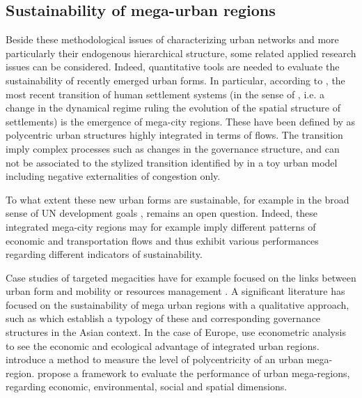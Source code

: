 \documentclass{jimis-en}
\begin{document}
\subsection{Sustainability of mega-urban regions}


Beside these methodological issues of characterizing urban networks and more particularly their endogenous hierarchical structure, some related applied research issues can be considered. Indeed, quantitative tools are needed to evaluate the sustainability of recently emerged urban forms. In particular, according to \cite{lenechet2017peupler}, the most recent transition of human settlement systems (in the sense of \cite{sanders2017peupler}, i.e. a change in the dynamical regime ruling the evolution of the spatial structure of settlements) is the emergence of mega-city regions. These have been defined by \cite{hall2006polycentric} as polycentric urban structures highly integrated in terms of flows. The transition imply complex processes such as changes in the governance structure, and can not be associated to the stylized transition identified by \cite{louf2013modeling} in a toy urban model including negative externalities of congestion only.

To what extent these new urban forms are sustainable, for example in the broad sense of UN development goals \citep{komiyama2006sustainability}, remains an open question. Indeed, these integrated mega-city regions may for example imply different patterns of economic and transportation flows and thus exhibit various performances regarding different indicators of sustainability.

Case studies of targeted megacities have for example focused on the links between urban form and mobility or resources management \citep{sorensen2010megacities}. A significant literature has focused on the sustainability of mega urban regions with a qualitative approach, such as \cite{laquian2011planning} which establish a typology of these and corresponding governance structures in the Asian context. In the case of Europe, \cite{marull2013emerging} use econometric analysis to see the economic and ecological advantage of integrated urban regions. \cite{feng2018spatiotemporal} introduce a method to measure the level of polycentricity of an urban mega-region. \cite{su2017china} propose a framework to evaluate the performance of urban mega-regions, regarding economic, environmental, social and spatial dimensions.
\end{document}
